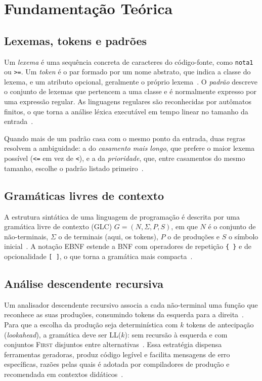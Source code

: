 \documentclass[conference]{IEEEtran}
\begin{document}
\section{Fundamentação Teórica}\label{sec:fund}

\subsection{Lexemas, tokens e padrões}
Um \emph{lexema} é uma sequência concreta de caracteres do código-fonte, como
\texttt{nota1} ou \texttt{>=}. Um \emph{token} é o par formado por um nome
abstrato, que indica a classe do lexema, e um atributo opcional, geralmente o
próprio lexema~\cite{aho2006}. O \emph{padrão} descreve o conjunto de lexemas
que pertencem a uma classe e é normalmente expresso por uma expressão regular.
As linguagens regulares são reconhecidas por autômatos finitos, o que torna a
análise léxica executável em tempo linear no tamanho da
entrada~\cite{hopcroft2006}.

Quando mais de um padrão casa com o mesmo ponto da entrada, duas regras
resolvem a ambiguidade: a do \emph{casamento mais longo}, que prefere o maior
lexema possível (\texttt{<=} em vez de \texttt{<}), e a da \emph{prioridade},
que, entre casamentos do mesmo tamanho, escolhe o padrão listado
primeiro~\cite{cooper2011}.

\subsection{Gramáticas livres de contexto}
A estrutura sintática de uma linguagem de programação é descrita por uma
gramática livre de contexto (GLC) $G = (N, \Sigma, P, S)$, em que $N$ é o
conjunto de não-terminais, $\Sigma$ o de terminais (aqui, os tokens), $P$ o de
produções e $S$ o símbolo inicial~\cite{hopcroft2006}. A notação EBNF
estende a BNF com operadores de repetição \texttt{\{~\}} e de opcionalidade
\texttt{[~]}, o que torna a gramática mais compacta~\cite{wirth1977}.

\subsection{Análise descendente recursiva}
Um analisador descendente recursivo associa a cada não-terminal uma função
que reconhece as suas produções, consumindo tokens da esquerda para a
direita~\cite{louden2004}. Para que a escolha da produção seja
determinística com $k$ tokens de antecipação (\textit{lookahead}), a
gramática deve ser LL($k$): sem recursão à esquerda e com conjuntos
\textsc{First} disjuntos entre alternativas~\cite{grune2008}. Essa estratégia
dispensa ferramentas geradoras, produz código legível e facilita mensagens de
erro específicas, razões pelas quais é adotada por compiladores de produção e
recomendada em contextos didáticos~\cite{nystrom2021}.
\end{document}
